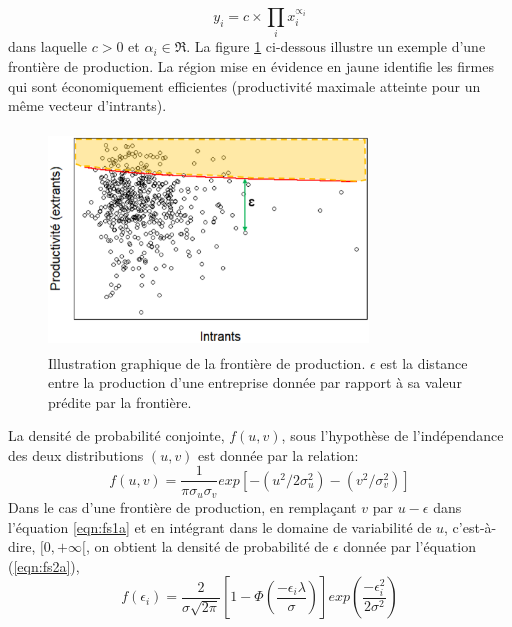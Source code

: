 %
\begin{equation}\label{eqn:Chp2Cobb}
	y_{i} = c \times \prod_{i} x^{\propto_{i}}_{i}
\end{equation}
%
dans laquelle $c > 0$  et $\alpha_{i} \in \Re$. La figure \ref{FrontiereCTV} ci-dessous illustre un exemple d’une frontière de production. La région mise en évidence en jaune identifie les firmes qui sont économiquement efficientes (productivité maximale atteinte pour un même vecteur d’intrants).
%
\begin{figure}[ht!]
\centering
\includegraphics[width=8.5cm,height=5.8cm]{FrontiereCTV}
\caption{\label{FrontiereCTV} Illustration graphique de la frontière de production. $\epsilon$ est la distance entre la production d'une entreprise donnée par rapport à sa valeur prédite par la frontière.}
\end{figure}
%
La densité de probabilité conjointe, $f(u, v)$, sous l'hypothèse de l'indépendance des deux distributions $(u, v)$ est donnée par la relation:
%
\begin{equation}\label{eqn:fs1a}
f(u, v)=\frac{1}{\pi\sigma_{u}\sigma_{v}}exp\left[-\left(u^{2}/2\sigma^{2}_{u}\right)-\left(v^{2}/\sigma^{2}_{v}\right)\right]
\end{equation}
%
Dans le cas d'une frontière de production, en remplaçant $v$ par $u-\epsilon$ dans l'équation \ref{eqn:fs1a} et en intégrant dans le domaine de variabilité de $u$, c'est-à-dire, $[0, +\infty[$, on obtient la densité de probabilité de $\epsilon$ donnée par l'équation (\ref{eqn:fs2a}),
%
\begin{equation}\label{eqn:fs2a}
f\left(\epsilon_{i}\right) = \frac{2}{\sigma\sqrt{2\pi}}\left[1-\Phi\left(\frac{-\epsilon_{i}\lambda}{\sigma}\right)\right]exp\left(\frac{-\epsilon^{2}_{i}}{2\sigma^{2}}\right)
\end{equation}
%

